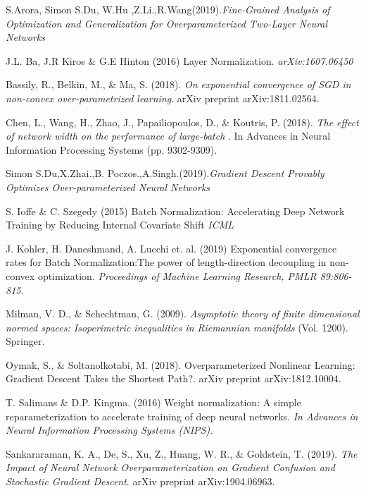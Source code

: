 \documentclass{article}
\begin{document}
\begin{thebibliography}{9}
S.Arora, Simon S.Du, W.Hu ,Z.Li.,R.Wang(2019).\textit{Fine-Grained Analysis of Optimization and Generalization for Overparameterized Two-Layer Neural Networks}

J.L. Ba, J.R Kiros \& G.E Hinton (2016) Layer Normalization. \textit{arXiv:1607.06450}

Bassily, R., Belkin, M., \& Ma, S. (2018). \textit{On exponential convergence of SGD in non-convex over-parametrized learning}. arXiv preprint arXiv:1811.02564.

Chen, L., Wang, H., Zhao, J., Papailiopoulos, D., \& Koutris, P. (2018). \textit{The effect of network width on the performance of large-batch }. In Advances in Neural Information Processing Systems (pp. 9302-9309).

Simon S.Du,X.Zhai.,B. Poczos.,A.Singh.(2019).\textit{Gradient Descent Provably Optimizes Over-parameterized Neural Networks}

S. Ioffe \& C. Szegedy (2015) Batch Normalization: Accelerating Deep Network Training by Reducing Internal Covariate Shift \textit{ICML}

J. Kohler, H. Daneshmand, A. Lucchi et. al. (2019) Exponential convergence rates for Batch Normalization:The power of length-direction decoupling in non-convex optimization. 	\textit{Proceedings of Machine Learning Research, PMLR 89:806-815.}

Milman, V. D., \& Schechtman, G. (2009). \textit{Asymptotic theory of finite dimensional normed spaces: Isoperimetric inequalities in Riemannian manifolds} (Vol. 1200). Springer.

Oymak, S., \& Soltanolkotabi, M. (2018). Overparameterized Nonlinear Learning: Gradient Descent Takes the Shortest Path?. arXiv preprint arXiv:1812.10004.
 
T. Salimans \& D.P. Kingma. (2016) Weight normalization: A simple reparameterization to accelerate
training of deep neural networks. \textit{In Advances in Neural Information Processing Systems (NIPS)}.

Sankararaman, K. A., De, S., Xu, Z., Huang, W. R., \& Goldstein, T. (2019). \textit{The Impact of Neural Network Overparameterization on Gradient Confusion and Stochastic Gradient Descent}. arXiv preprint arXiv:1904.06963.


\end{thebibliography}
\end{document}
